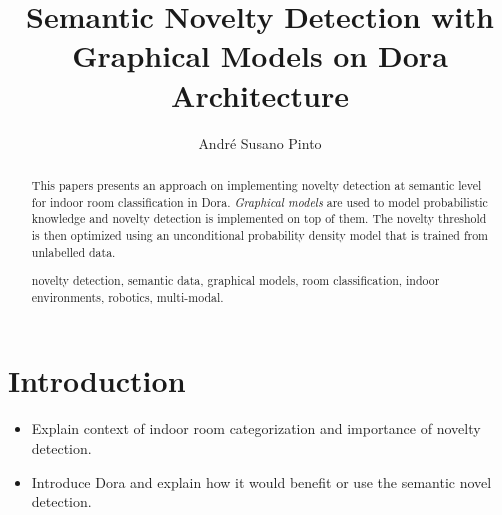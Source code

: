 \documentclass[runningheads,a4paper]{llncs}
\newcommand{\keywords}[1]{\par\addvspace\baselineskip
\noindent\keywordname\enspace\ignorespaces#1}
\begin{document}
\mainmatter  %

\title{Semantic Novelty Detection with Graphical Models
on Dora Architecture}


%
%
\author{André Susano Pinto}
%


\maketitle


\begin{abstract}
This papers presents an approach on implementing novelty detection at semantic level
for indoor room classification in Dora. \emph{Graphical models} are used to model
probabilistic knowledge and novelty detection is implemented on top of them.
The novelty threshold is then optimized using an unconditional probability density
model that is trained from unlabelled data.

\keywords{novelty detection, semantic data, graphical models, room classification,
indoor environments, robotics, multi-modal.}
\end{abstract}


\section{Introduction}
\begin{itemize}
\item Explain context of indoor room categorization and importance of novelty detection.
\item Introduce Dora and explain how it would benefit or use the semantic novel detection.
\end{itemize}
\end{document}
